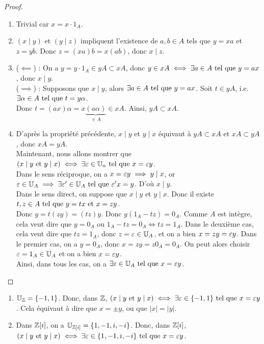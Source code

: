\documentclass[12pt, a4paper]{report}
\begin{document}
\begin{proof}
    \begin{enumerate}
        \item Trivial car $x = x \cdot 1_A$.
        \item $(x \mid y)$ et $(y \mid z)$ impliquent l'existence de $a,b \in A$ tels que $y = xa$ et $z = yb$. Donc $z = (xa)b = x(ab)$, donc $x \mid z$.
        \item ($\impliedby$) : On a $y=y\cdot 1_A \in yA \subset xA$, donc $y \in xA \iff \exists a \in A \text{ tel que } y = ax$, donc $x\mid y$.\\($\implies$) : Supposons que $x\mid y$, alors $\exists a \in A \text{ tel que } y = ax$. Soit $t \in yA$, i.e. $\exists \alpha \in A \text{ tel que } t = y\alpha$.\\Donc $t = (ax)\alpha = x\underbrace{(a\alpha)}_{\in A} \in xA$. Ainsi, $yA \subset xA$.
        \item D'après la propriété précédente, $x\mid y$ et $y \mid x$ équivaut à $yA \subset xA$ et $xA \subset yA$, donc $xA = yA$.\\Maintenant, nous allons montrer que $(x \mid y \text{ et } y \mid x) \iff \exists \varepsilon \in \mathbb{U}_n \text{ tel que } x = \varepsilon y$.\\Dans le sens réciproque, on a $x=\varepsilon y \implies y \mid x$, or $\varepsilon \in \mathbb{U}_A \implies \exists \varepsilon' \in \mathbb{U}_A \text{ tel que } \varepsilon'x=y$. D'où $x\mid y$.\\Dans le sens direct, on suppose que $x\mid y$ et $y \mid x$. Donc il existe $t,z \in A \text{ tel que } y=tx \text{ et } x=zy$.\\Donc $y=t(zy) = (tz)y$. Donc $y(1_A - tz) = 0_A$. Comme $A$ est intègre, cela veut dire que $y=0_A$ ou $1_A - tz = 0_A \iff tz = 1_A$. Dans le deuxième cas, cela veut dire que $tz=1_A$, donc $z=\varepsilon \in \mathbb{U}_A$, et on a bien $x = zy = \varepsilon y$. Dans le premier cas, on a $y=0_A$, donc $x=zy= z0_A = 0_A$. On peut alors choisir $\varepsilon = 1_A \in \mathbb{U}_A$ et on a bien $x=\varepsilon y$.\\Ainsi, dans tous les cas, on a $\exists \varepsilon \in \mathbb{U}_A \text{ tel que } x = \varepsilon y$.
    \end{enumerate}
\end{proof}

\begin{example}
    \begin{enumerate}
        \item $\mathbb{U}_{\mathbb{Z}} = \{-1,1\}$. Donc, dans $\mathbb{Z}$, $(x\mid y \text{ et } y \mid x) \iff \exists \varepsilon \in \{-1,1\} \text{ tel que } x = \varepsilon y$. Cela équivaut à dire que $x=\pm y$, ou que $|x|=|y|$.
        \item Dans $\mathbb{Z}[i]$, on a $\mathbb{U}_{\mathbb{Z}[i]} = \{1,-1,i,-i\}$. Donc, dans $\mathbb{Z}[i]$, $(x\mid y \text{ et } y \mid x) \iff \exists \varepsilon \in \{1,-1,i,-i\} \text{ tel que } x = \varepsilon y$.
    \end{enumerate}
\end{example}
\end{document}
